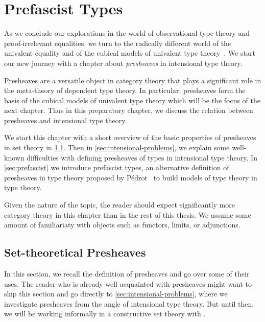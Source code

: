 \setchapterpreamble[u]{\margintoc}
\chapter{Prefascist Types}

As we conclude our explorations in the world of observational type theory 
and proof-irrelevant equalities, we turn to the radically different world 
of the univalent equality and of the cubical models of univalent type 
theory~\cite{BezemCoquandHuber14, CCHM}. We start our new journey with
a chapter about \emph{presheaves} in intensional type theory.

Presheaves are a versatile object in category theory that plays a significant
role in the meta-theory of dependent type theory. 
In particular, presheaves form the basis of the cubical models of univalent type
theory which will be the focus of the next chapter.
Thus in this preparatory chapter, we discuss the relation between presheaves and 
intensional type theory.

We start this chapter with a short overview of the basic properties of presheaves in
set theory in \cref{sec:categorical-reminders}. Then in 
\cref{sec:intensional-problems}, we explain some well-known difficulties
with defining presheaves of types in intensional type theory. In
\cref{sec:prefascist} we introduce prefascist types, an alternative
definition of presheaves in type theory proposed by 
Pédrot~ to build models of type theory in
type theory.

Given the nature of the topic, the reader should expect significantly more
category theory in this chapter than in the rest of this thesis. 
We assume some amount of familiariaty with objects such as functors, limits, 
or adjunctions.

\section{Set-theoretical Presheaves}
\label{sec:categorical-reminders}

In this section, we recall the definition of presheaves and go 
over some of their uses.
% 
The reader who is already well acquainted with presheaves might want to skip
this section and go directly to \cref{sec:intensional-problems}, where we
investigate presheaves from the angle of intensional type theory.
% 
But until then, we will be working informally in a constructive set theory with
.

